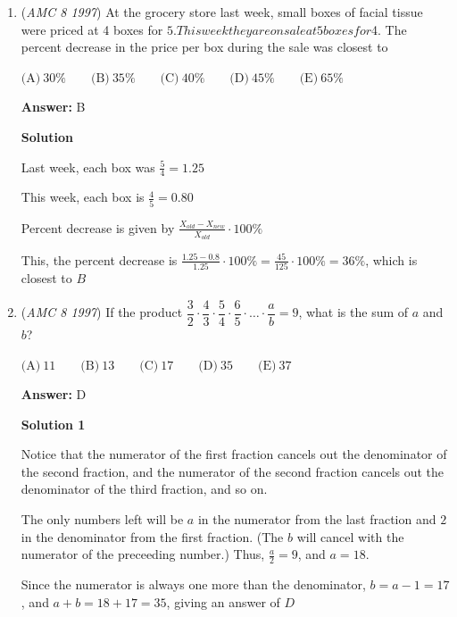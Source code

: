 \begin{enumerate}
 However, each diagonal was counted as both a "starting point" and an "ending point".  So there are really $\frac{32}{2} = 16$ diagonals, giving an answer of $\boxed{E}$.

 


	\item (\textit{AMC 8 1997}) At the grocery store last week, small boxes of facial tissue were priced at 4 boxes for $5.  This week they are on sale at 5 boxes for $4.  The percent decrease in the price per box during the sale was closest to


 $\text{(A)}\ 30\% \qquad \text{(B)}\ 35\% \qquad \text{(C)}\ 40\% \qquad \text{(D)}\ 45\% \qquad \text{(E)}\ 65\%$

 \textbf{Answer: }B



\textbf{Solution}

Last week, each box was $\frac{5}{4} = 1.25$

 This week, each box is $\frac{4}{5} = 0.80$

 Percent decrease is given by $\frac{X_{old} - X_{new}}{X_{old}} \cdot 100\%$

 This, the percent decrease is $\frac{1.25 - 0.8}{1.25}\cdot 100\% = \frac{45}{125} \cdot 100\% = 36\%$, which is closest to $\boxed{B}$



	\item (\textit{AMC 8 1997}) If the product $\dfrac{3}{2}\cdot \dfrac{4}{3}\cdot \dfrac{5}{4}\cdot \dfrac{6}{5}\cdot \ldots\cdot \dfrac{a}{b} = 9$, what is the sum of $a$ and $b$?


 $\text{(A)}\ 11 \qquad \text{(B)}\ 13 \qquad \text{(C)}\ 17 \qquad \text{(D)}\ 35 \qquad \text{(E)}\ 37$

 \textbf{Answer: }D



\textbf{Solution 1}

Notice that the numerator of the first fraction cancels out the denominator of the second fraction, and the numerator of the second fraction cancels out the denominator of the third fraction, and so on.

 The only numbers left will be $a$ in the numerator from the last fraction and $2$ in the denominator from the first fraction.  (The $b$ will cancel with the numerator of the preceeding number.)  Thus, $\frac{a}{2} = 9$, and $a=18$.

 Since the numerator is always one more than the denominator, $b = a-1 = 17$, and $a+ b = 18 + 17 = 35$, giving an answer of $\boxed{D}$





\end{enumerate}
